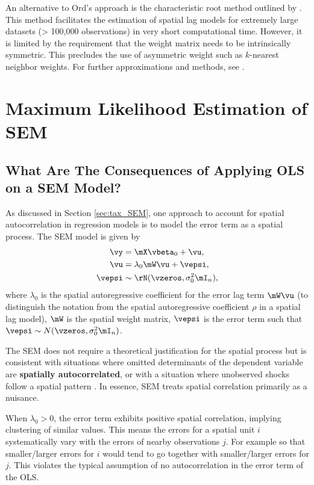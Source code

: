 \documentclass[english,12pt]{book}\usepackage[]{graphicx}\usepackage[]{xcolor}
\begin{document}
An alternative to Ord's approach is the characteristic root method outlined by \citet{smirnov2001fast}. This method facilitates the estimation of spatial lag models for extremely large datasets (> 100,000 observations) in very short computational time. However, it is limited by the requirement that the weight matrix needs to be intrinsically symmetric. This precludes the use of asymmetric weight such as $k$-nearest neighbor weights. For further approximations and methods,  see \citet[][chapter 4]{lesage2010introduction}.

\section{Maximum Likelihood Estimation of SEM}\label{sec:sem-ml}

\subsection{What Are The Consequences of Applying OLS on a SEM Model?}

As discussed in Section \ref{sec:tax_SEM}, one approach to account for spatial autocorrelation in regression models is to model the error term as a spatial process.  The SEM model is given by
\begin{equation}\label{eq:sem_ml}
	\begin{aligned}
	\vy  & = \mX\vbeta_0 + \vu, \\ 
	 \vu & = \lambda_0 \mW \vu + \vepsi, \\
	 \vepsi & \sim \rN(\vzeros, \sigma^2_0\mI_n),
	\end{aligned}
\end{equation}
%
where $\lambda_0$ is the spatial autoregressive coefficient for the error lag term $\mW\vu$ (to distinguish the notation from the spatial autoregressive coefficient $\rho$ in a spatial lag model), $\mW$ is the spatial weight matrix, $\vepsi$ is the error term such that $\vepsi \sim N(\vzeros, \sigma^2_0\mI_n)$. 

The SEM does not require a theoretical justification for the spatial process but is consistent with situations where omitted determinants of the dependent variable are \textbf{spatially autocorrelated}, or with a situation where unobserved shocks follow a spatial pattern \citep{elhorst2014spatial}. In essence, SEM treats spatial correlation primarily as a nuisance. 

When $\lambda_0 > 0$, the error term exhibits positive spatial correlation, implying clustering of similar values. This means the errors for a spatial unit $i$ systematically vary with the errors of nearby observations  $j$. For example so that smaller/larger errors for $i$ would tend to go together with smaller/larger errors for $j$. This violates the typical assumption of no autocorrelation in the error term of the OLS. 
\end{document}
